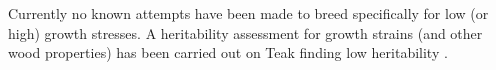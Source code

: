 Currently no known attempts have been made to breed specifically for low (or high) growth stresses. A heritability assessment for growth strains (and other wood properties) has been carried out on Teak finding low heritability \citep{naranjo2012early}.